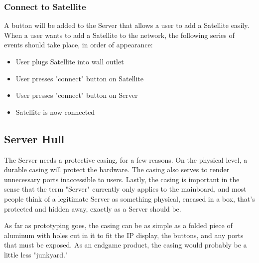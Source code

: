 \subsubsection{Connect to Satellite}
A button will be added to the Server that allows a user to add a Satellite easily.
When a user wants to add a Satellite to the network, the following series of events
should take place, in order of appearance:

\begin{itemize}
	\item User plugs Satellite into wall outlet
	\item User presses "connect" button on Satellite
	\item User presses "connect" button on Server
	\item Satellite is now connected
\end{itemize}
	
\subsection{Server Hull}
The Server needs a protective casing, for a few reasons. On the physical level, a
durable casing will protect the hardware. The casing also serves to render unnecessary
ports inaccessible to users. Lastly, the casing is important in the sense that the
term "Server" currently only applies to the mainboard, and most people think of a 
legitimate Server as something physical, encased in a box, that's protected and
hidden away, exactly as a Server should be.

As far as prototyping goes, the casing can be as simple as a folded piece of aluminum
with holes cut in it to fit the IP display, the buttons, and any ports that must be
exposed. As an end\-game product, the casing would probably be a little less "junkyard."


